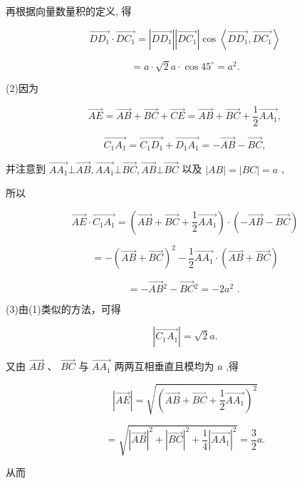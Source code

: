 \documentclass[10pt]{article}
\begin{document}
再根据向量数量积的定义, 得

\[
\overrightarrow{D{D}_{1}} \cdot  \overrightarrow{D{C}_{1}} = \left| \overrightarrow{D{D}_{1}}\right| \left| \overrightarrow{D{C}_{1}}\right| \cos \left\langle  {\overrightarrow{D{D}_{1}},\overrightarrow{D{C}_{1}}}\right\rangle
\]

\[
= a \cdot  \sqrt{2}a \cdot  \cos {45}^{ \circ  } = {a}^{2}.
\]

(2)因为

\[
\overrightarrow{AE} = \overrightarrow{AB} + \overrightarrow{BC} + \overrightarrow{CE} = \overrightarrow{AB} + \overrightarrow{BC} + \frac{1}{2}\overrightarrow{A{A}_{1}},
\]

\[
\overrightarrow{{C}_{1}{A}_{1}} = \overrightarrow{{C}_{1}{D}_{1}} + \overrightarrow{{D}_{1}{A}_{1}} =  - \overrightarrow{AB} - \overrightarrow{BC},
\]

并注意到 \(\overrightarrow{A{A}_{1}} \bot  \overrightarrow{AB},\overrightarrow{A{A}_{1}} \bot  \overrightarrow{BC},\overrightarrow{AB} \bot  \overrightarrow{BC}\) 以及 \(\left| {AB}\right|  = \left| {BC}\right|  = a\) ,

所以

\[
\overrightarrow{AE} \cdot  \overrightarrow{{C}_{1}{A}_{1}} = \left( {\overrightarrow{AB} + \overrightarrow{BC} + \frac{1}{2}\overrightarrow{A{A}_{1}}}\right)  \cdot  \left( {-\overrightarrow{AB} - \overrightarrow{BC}}\right)
\]

\[
=  - {\left( \overrightarrow{AB} + \overrightarrow{BC}\right) }^{2} - \frac{1}{2}\overrightarrow{A{A}_{1}} \cdot  \left( {\overrightarrow{AB} + \overrightarrow{BC}}\right)
\]

\[
=  - \overrightarrow{AB}{}^{2} - \overrightarrow{BC}{}^{2} =  - 2{a}^{2}\text{ . }
\]

(3)由(1)类似的方法，可得

\[
\left| \overrightarrow{{C}_{1}{A}_{1}}\right|  = \sqrt{2}a.
\]

又由 \(\overrightarrow{AB}\text{ 、 }\overrightarrow{BC}\) 与 \(\overrightarrow{A{A}_{1}}\) 两两互相垂直且模均为 \(a\) ,得

\[
\left| \overrightarrow{AE}\right|  = \sqrt{{\left( \overrightarrow{AB} + \overrightarrow{BC} + \frac{1}{2}\overrightarrow{A{A}_{1}}\right) }^{2}}
\]

\[
= \sqrt{{\left| \overrightarrow{AB}\right| }^{2} + {\left| \overrightarrow{BC}\right| }^{2} + \frac{1}{4}{\left| \overrightarrow{A{A}_{1}}\right| }^{2}} = \frac{3}{2}a.
\]

从而
\end{document}
